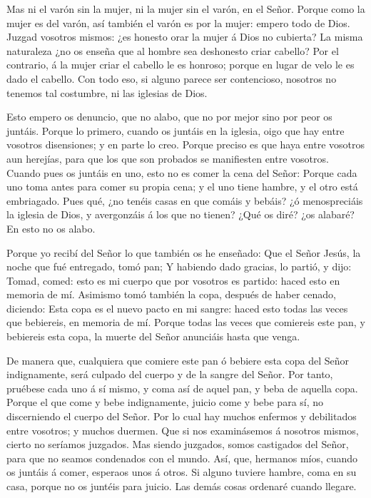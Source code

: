  Mas ni el varón sin la mujer, ni la mujer sin el varón, en
el Señor.  Porque como la mujer es del varón, así también
el varón es por la mujer: empero todo de Dios.  Juzgad
vosotros mismos: ¿es honesto orar la mujer á Dios no cubierta?
 La misma naturaleza ¿no os enseña que al hombre sea
deshonesto criar cabello?  Por el contrario, á la mujer
criar el cabello le es honroso; porque en lugar de velo le es dado el
cabello.  Con todo eso, si alguno parece ser contencioso,
nosotros no tenemos tal costumbre, ni las iglesias de Dios.

 Esto empero os denuncio, que no alabo, que no por mejor
sino por peor os juntáis.  Porque lo primero, cuando os
juntáis en la iglesia, oigo que hay entre vosotros disensiones; y en
parte lo creo.  Porque preciso es que haya entre vosotros
aun herejías, para que los que son probados se manifiesten entre
vosotros.  Cuando pues os juntáis en uno, esto no es comer
la cena del Señor:  Porque cada uno toma antes para comer
su propia cena; y el uno tiene hambre, y el otro está embriagado.
 Pues qué, ¿no tenéis casas en que comáis y bebáis? ¿ó
menospreciáis la iglesia de Dios, y avergonzáis á los que no tienen?
¿Qué os diré? ¿os alabaré? En esto no os alabo.

 Porque yo recibí del Señor lo que también os he enseñado:
Que el Señor Jesús, la noche que fué entregado, tomó pan; 
Y habiendo dado gracias, lo partió, y dijo: Tomad, comed: esto es mi
cuerpo que por vosotros es partido: haced esto en memoria de mí.
 Asimismo tomó también la copa, después de haber cenado,
diciendo: Esta copa es el nuevo pacto en mi sangre: haced esto todas las
veces que bebiereis, en memoria de mí.  Porque todas las
veces que comiereis este pan, y bebiereis esta copa, la muerte del Señor
anunciáis hasta que venga.

 De manera que, cualquiera que comiere este pan ó bebiere
esta copa del Señor indignamente, será culpado del cuerpo y de la sangre
del Señor.  Por tanto, pruébese cada uno á sí mismo, y coma
así de aquel pan, y beba de aquella copa.  Porque el que
come y bebe indignamente, juicio come y bebe para sí, no discerniendo el
cuerpo del Señor.  Por lo cual hay muchos enfermos y
debilitados entre vosotros; y muchos duermen.  Que si nos
examinásemos á nosotros mismos, cierto no seríamos juzgados.
 Mas siendo juzgados, somos castigados del Señor, para que
no seamos condenados con el mundo.  Así, que, hermanos
míos, cuando os juntáis á comer, esperaos unos á otros.  Si
alguno tuviere hambre, coma en su casa, porque no os juntéis para
juicio. Las demás cosas ordenaré cuando llegare.

